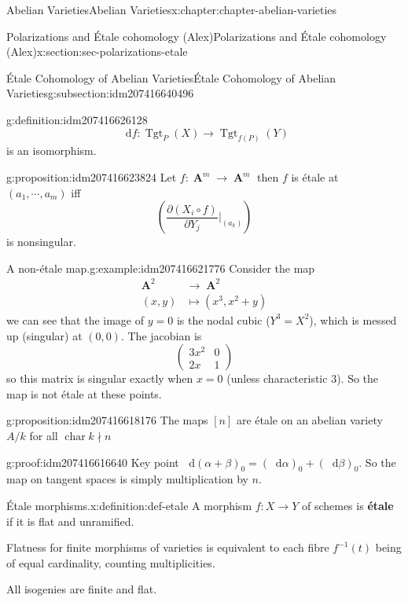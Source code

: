 \documentclass[oneside,10pt,]{book}
\newcommand{\terminology}[1]{\textbf{#1}}
\numberwithin{equation}{section}
\newcommand{\diff}{\mathop{}\!\mathrm{d}}
\newcommand{\lb}{[}
\newcommand{\rb}{]}
\DeclareMathOperator{\Tgt}{Tgt}
\DeclareMathOperator{\characteristic}{char}
\DeclareMathOperator{\aff}{\mathbf{A}}
\newcommand{\amp}{&}
\begin{document}
\begin{chapterptx}{Abelian Varieties}{}{Abelian Varieties}{}{}{x:chapter:chapter-abelian-varieties}
\begin{sectionptx}{Polarizations and Étale cohomology (Alex)}{}{Polarizations and Étale cohomology (Alex)}{}{}{x:section:sec-polarizations-etale}
\begin{subsectionptx}{Étale Cohomology of Abelian Varieties}{}{Étale Cohomology of Abelian Varieties}{}{}{g:subsection:idm207416640496}
\begin{definition}{}{g:definition:idm207416626128}
\begin{equation*}
\diff f\colon\Tgt_{P}(X) \to \Tgt_{f(P)} (Y)
\end{equation*}
is an isomorphism.%
\end{definition}
\begin{proposition}{}{}{g:proposition:idm207416623824}%
Let \(f \colon \aff^m\to \aff^m\) then \(f\) is étale at \((a_1, \cdots, a_m)\) iff%
\begin{equation*}
\left(\frac{\partial(X_i \circ f)}{\partial Y_j}|_{(a_k)} \right)
\end{equation*}
is nonsingular.%
\end{proposition}
\begin{example}{A non-étale map.}{g:example:idm207416621776}%
Consider the map%
\begin{align*}
\aff^2 \amp\to \aff^2\\
(x,y) \amp\mapsto (x^3, x^2 + y)
\end{align*}
we can see that the image of \(y= 0\) is the nodal cubic (\(Y^3 = X^2\)), which is messed up (singular) at \((0,0)\). The jacobian is%
\begin{equation*}
\begin{pmatrix} 3x^2 \amp 0 \\ 2x \amp 1\end{pmatrix}
\end{equation*}
so this matrix is singular exactly when \(x= 0\) (unless characteristic 3). So the map is not étale at these points.%
\end{example}
\begin{proposition}{}{}{g:proposition:idm207416618176}%
The maps \(\lb n\rb\) are étale on an abelian variety \(A/k\) for all  \(\characteristic{k} \nmid n\)%
\end{proposition}
\begin{proofptx}{}{g:proof:idm207416616640}
Key point \(\diff (\alpha+ \beta)_0 = (\diff \alpha )_0 + (\diff \beta)_0\). So the map on tangent spaces is simply multiplication by \(n\).%
\end{proofptx}
\begin{definition}{Étale morphisms.}{x:definition:def-etale}%
A morphism \(f\colon X\to Y\) of schemes is \terminology{étale} if it is flat and unramified.%
\par
Flatness for finite morphisms of varieties is equivalent to each fibre \(f^{-1}(t)\) being of equal cardinality, counting multiplicities.%
\end{definition}
All isogenies are finite and flat.%

\end{subsectionptx}
\end{sectionptx}
\end{chapterptx}
\end{document}
